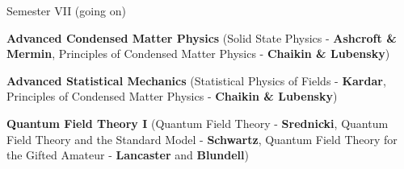 \begin{cventries}
\cventry
{Semester VII (going on)} %
{} %
{} %
{} %
{
	\begin{cvitems} %
		\item {\textbf{Advanced Condensed Matter Physics} (Solid State Physics - \textbf{Ashcroft \& Mermin}, Principles of Condensed Matter Physics - \textbf{Chaikin \& Lubensky})}
		\item {\textbf{Advanced Statistical Mechanics} (Statistical Physics of Fields - \textbf{Kardar}, Principles of Condensed Matter Physics - \textbf{Chaikin \& Lubensky})}
		\item {\textbf{Quantum Field Theory I} (Quantum Field Theory - \textbf{Srednicki}, Quantum Field Theory and the Standard Model - \textbf{Schwartz}, Quantum Field Theory for the Gifted Amateur - \textbf{Lancaster} and \textbf{Blundell})}
	\end{cvitems}
}
\end{cventries}

